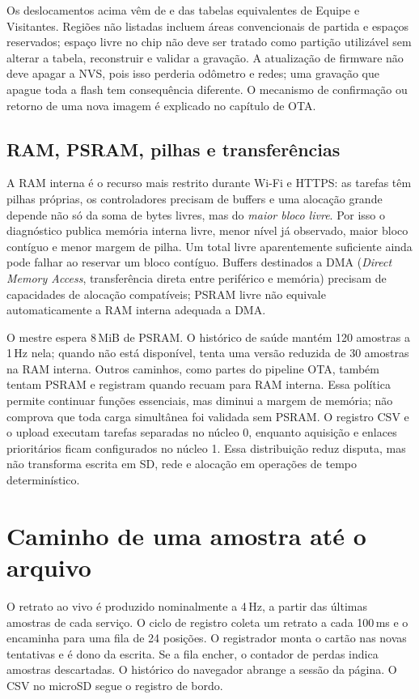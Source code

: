Os deslocamentos acima vêm de  e das tabelas equivalentes de Equipe e Visitantes. Regiões não listadas incluem áreas convencionais de partida e espaços reservados; espaço livre no chip não deve ser tratado como partição utilizável sem alterar a tabela, reconstruir e validar a gravação. A atualização de firmware não deve apagar a NVS, pois isso perderia odômetro e redes; uma gravação que apague toda a flash tem consequência diferente. O mecanismo de confirmação ou retorno de uma nova imagem é explicado no capítulo de OTA.

\subsection{RAM, PSRAM, pilhas e transferências}
A RAM interna é o recurso mais restrito durante Wi-Fi e HTTPS: as tarefas têm pilhas próprias, os controladores precisam de buffers e uma alocação grande depende não só da soma de bytes livres, mas do \emph{maior bloco livre}. Por isso o diagnóstico publica memória interna livre, menor nível já observado, maior bloco contíguo e menor margem de pilha. Um total livre aparentemente suficiente ainda pode falhar ao reservar um bloco contíguo. Buffers destinados a DMA (\emph{Direct Memory Access}, transferência direta entre periférico e memória) precisam de capacidades de alocação compatíveis; PSRAM livre não equivale automaticamente a RAM interna adequada a DMA.

O mestre espera 8\,MiB de PSRAM. O histórico de saúde mantém 120 amostras a 1\,Hz nela; quando não está disponível, tenta uma versão reduzida de 30 amostras na RAM interna. Outros caminhos, como partes do pipeline OTA, também tentam PSRAM e registram quando recuam para RAM interna. Essa política permite continuar funções essenciais, mas diminui a margem de memória; não comprova que toda carga simultânea foi validada sem PSRAM. O registro CSV e o upload executam tarefas separadas no núcleo 0, enquanto aquisição e enlaces prioritários ficam configurados no núcleo 1. Essa distribuição reduz disputa, mas não transforma escrita em SD, rede e alocação em operações de tempo determinístico.

\section{Caminho de uma amostra até o arquivo}\label{sec:csv_fluxo}
O retrato ao vivo é produzido nominalmente a 4\,Hz, a partir das últimas amostras de cada serviço. O ciclo de registro coleta um retrato a cada 100\,ms e o encaminha para uma fila de 24 posições. O registrador monta o cartão nas novas tentativas e é dono da escrita. Se a fila encher, o contador de perdas indica amostras descartadas. O histórico do navegador abrange a sessão da página. O CSV no microSD segue o registro de bordo.

